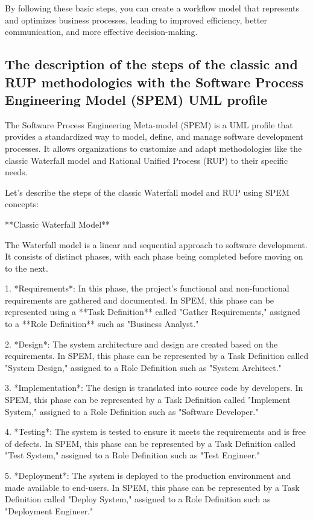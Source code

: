 \documentclass{article}
\begin{document}
By following these basic steps, you can create a workflow model that represents and optimizes business processes, leading to improved efficiency, better communication, and more effective decision-making.



\subsection{The description of the steps of the classic and RUP methodologies with the Software Process Engineering Model (SPEM) UML profile}

The Software Process Engineering Meta-model (SPEM) is a UML profile that provides a standardized way to model, define, and manage software development processes. It allows organizations to customize and adapt methodologies like the classic Waterfall model and Rational Unified Process (RUP) to their specific needs.

Let's describe the steps of the classic Waterfall model and RUP using SPEM concepts:

**Classic Waterfall Model**

The Waterfall model is a linear and sequential approach to software development. It consists of distinct phases, with each phase being completed before moving on to the next.

1. *Requirements*: In this phase, the project's functional and non-functional requirements are gathered and documented. In SPEM, this phase can be represented using a **Task Definition** called "Gather Requirements," assigned to a **Role Definition** such as "Business Analyst."

2. *Design*: The system architecture and design are created based on the requirements. In SPEM, this phase can be represented by a Task Definition called "System Design," assigned to a Role Definition such as "System Architect."

3. *Implementation*: The design is translated into source code by developers. In SPEM, this phase can be represented by a Task Definition called "Implement System," assigned to a Role Definition such as "Software Developer."

4. *Testing*: The system is tested to ensure it meets the requirements and is free of defects. In SPEM, this phase can be represented by a Task Definition called "Test System," assigned to a Role Definition such as "Test Engineer."

5. *Deployment*: The system is deployed to the production environment and made available to end-users. In SPEM, this phase can be represented by a Task Definition called "Deploy System," assigned to a Role Definition such as "Deployment Engineer."
\end{document}
